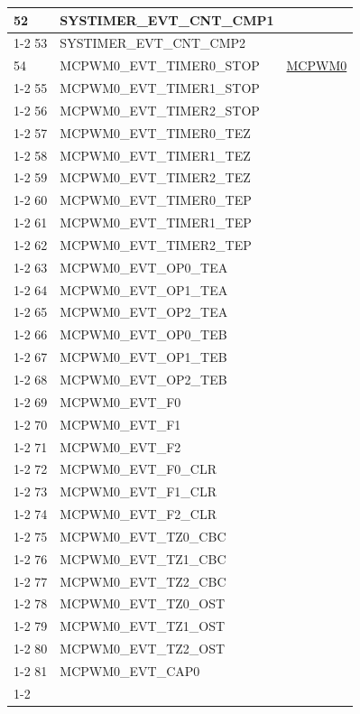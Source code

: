 \documentclass[main\_\_CN.tex]{subfiles}
\begin{document}
\begin{longtable}{ | l | l | l | }
52  & SYSTIMER\_EVT\_CNT\_CMP1  & \\ \cline{1-2}
53  & SYSTIMER\_EVT\_CNT\_CMP2  & \\ \hline
54  & MCPWM0\_EVT\_TIMER0\_STOP  & \hyperref[mod:mcpwm]{MCPWM0}\\ \cline{1-2}
55  & MCPWM0\_EVT\_TIMER1\_STOP  & \\ \cline{1-2}
56  & MCPWM0\_EVT\_TIMER2\_STOP  & \\ \cline{1-2}
57  & MCPWM0\_EVT\_TIMER0\_TEZ   & \\ \cline{1-2}
58  & MCPWM0\_EVT\_TIMER1\_TEZ   & \\ \cline{1-2}
59  & MCPWM0\_EVT\_TIMER2\_TEZ   & \\ \cline{1-2}
60  & MCPWM0\_EVT\_TIMER0\_TEP   & \\ \cline{1-2}
61  & MCPWM0\_EVT\_TIMER1\_TEP   & \\ \cline{1-2}
62  & MCPWM0\_EVT\_TIMER2\_TEP   & \\ \cline{1-2}
63  & MCPWM0\_EVT\_OP0\_TEA & \\ \cline{1-2}
64  & MCPWM0\_EVT\_OP1\_TEA & \\ \cline{1-2}
65  & MCPWM0\_EVT\_OP2\_TEA & \\ \cline{1-2}
66  & MCPWM0\_EVT\_OP0\_TEB & \\ \cline{1-2}
67  & MCPWM0\_EVT\_OP1\_TEB & \\ \cline{1-2}
68  & MCPWM0\_EVT\_OP2\_TEB & \\ \cline{1-2}
69  & MCPWM0\_EVT\_F0     & \\ \cline{1-2}
70  & MCPWM0\_EVT\_F1     & \\ \cline{1-2}
71  & MCPWM0\_EVT\_F2     & \\ \cline{1-2}
72  & MCPWM0\_EVT\_F0\_CLR  & \\ \cline{1-2}
73  & MCPWM0\_EVT\_F1\_CLR  & \\ \cline{1-2}
74  & MCPWM0\_EVT\_F2\_CLR  & \\ \cline{1-2}
75  & MCPWM0\_EVT\_TZ0\_CBC & \\ \cline{1-2}
76  & MCPWM0\_EVT\_TZ1\_CBC & \\ \cline{1-2}
77  & MCPWM0\_EVT\_TZ2\_CBC & \\ \cline{1-2}
78  & MCPWM0\_EVT\_TZ0\_OST & \\ \cline{1-2}
79  & MCPWM0\_EVT\_TZ1\_OST & \\ \cline{1-2}
80  & MCPWM0\_EVT\_TZ2\_OST & \\ \cline{1-2}
81  & MCPWM0\_EVT\_CAP0   & \\ \cline{1-2}

\end{longtable}
\end{document}
